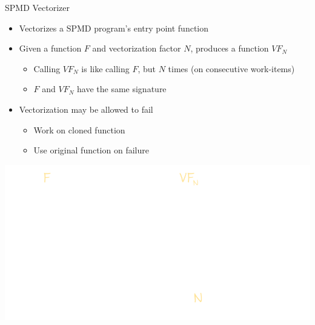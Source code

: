 \begin{frame}{SPMD Vectorizer}

\begin{minipage}[t]{0.45\linewidth}

\begin{itemize}
    \item Vectorizes a SPMD program's entry point function
    \item Given a function $F$ and vectorization factor $N$, produces a function $VF_N$
    \begin{itemize}
        \item Calling $VF_N$ is like calling $F$, but $N$ times (on consecutive work-items)
        \item $F$ and $VF_N$ have the same signature
    \end{itemize}
    
    
    \item Vectorization may be allowed to fail
    \begin{itemize}
        \item Work on cloned function
        \item Use original function on failure
    \end{itemize}
\end{itemize}

\end{minipage}
\hspace{1em}
\begin{minipage}[t]{0.48\linewidth}

\vspace{-0.1ex}
\begin{tcolorbox}
\includegraphics[width=\textwidth]{images/F-vs-VFn.pdf}
\end{tcolorbox}

\end{minipage}

\end{frame}

